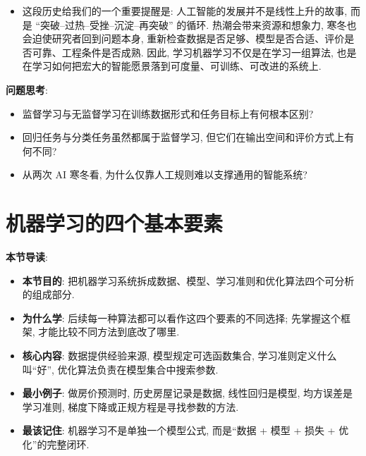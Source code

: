 \documentclass{../nndlcourse}
\begin{document}
\begin{enumerate}
\begin{itemize}
      \item 这段历史给我们的一个重要提醒是: 人工智能的发展并不是线性上升的故事, 而是 ``突破--过热--受挫--沉淀--再突破'' 的循环. 热潮会带来资源和想象力, 寒冬也会迫使研究者回到问题本身, 重新检查数据是否足够、模型是否合适、评价是否可靠、工程条件是否成熟. 因此, 学习机器学习不仅是在学习一组算法, 也是在学习如何把宏大的智能愿景落到可度量、可训练、可改进的系统上.
    \end{itemize}
\end{enumerate}

\textbf{问题思考}: 

\begin{itemize}
  \item 监督学习与无监督学习在训练数据形式和任务目标上有何根本区别?
  \item 回归任务与分类任务虽然都属于监督学习, 但它们在输出空间和评价方式上有何不同?
  \item 从两次 AI 寒冬看, 为什么仅靠人工规则难以支撑通用的智能系统?
\end{itemize}


\section{机器学习的四个基本要素}

\textbf{本节导读}:
\begin{itemize}
  \item \textbf{本节目的}: 把机器学习系统拆成数据、模型、学习准则和优化算法四个可分析的组成部分.
  \item \textbf{为什么学}: 后续每一种算法都可以看作这四个要素的不同选择; 先掌握这个框架, 才能比较不同方法到底改了哪里.
  \item \textbf{核心内容}: 数据提供经验来源, 模型规定可选函数集合, 学习准则定义什么叫“好”, 优化算法负责在模型集合中搜索参数.
  \item \textbf{最小例子}: 做房价预测时, 历史房屋记录是数据, 线性回归是模型, 均方误差是学习准则, 梯度下降或正规方程是寻找参数的方法.
  \item \textbf{最该记住}: 机器学习不是单独一个模型公式, 而是“数据 + 模型 + 损失 + 优化”的完整闭环.
\end{itemize}
\end{document}

